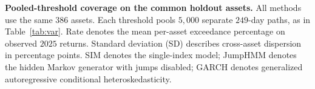 \begin{table}[H]
  \centering
  \caption{\textbf{Pooled-threshold coverage on the common holdout
    assets.} All methods use the same $386$ assets. Each threshold
    pools $5{,}000$ separate $249$-day paths, as in
    Table~\ref{tab:var}. Rate denotes the mean per-asset exceedance
    percentage on observed $2025$ returns. Standard deviation (SD)
    describes cross-asset dispersion in percentage points.
    SIM denotes the single-index model; JumpHMM denotes the hidden
    Markov generator with jumps disabled; GARCH denotes generalized
    autoregressive conditional heteroskedasticity.}
  \label{tab:var_common}
  \footnotesize
  \setlength{\tabcolsep}{4pt}
  
\end{table}
